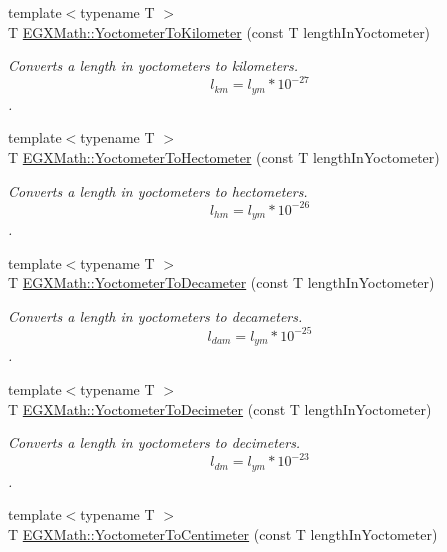 \begin{DoxyCompactItemize}
{\footnotesize template$<$typename T $>$ }\\T \mbox{\hyperlink{group___e_g_x_math-_conversions-_length_conversions-_yoctometer-_s_i_ga5736155a6aad5dc3b7b98706bda51484}{E\+G\+X\+Math\+::\+Yoctometer\+To\+Kilometer}} (const T length\+In\+Yoctometer)
\begin{DoxyCompactList}\small\item\em Converts a length in yoctometers to kilometers. \[ l_{km}=l_{ym} * 10^{-27} \]. \end{DoxyCompactList}\item 
{\footnotesize template$<$typename T $>$ }\\T \mbox{\hyperlink{group___e_g_x_math-_conversions-_length_conversions-_yoctometer-_s_i_ga3f2a47723b097c9c2b38edf4ca14ff03}{E\+G\+X\+Math\+::\+Yoctometer\+To\+Hectometer}} (const T length\+In\+Yoctometer)
\begin{DoxyCompactList}\small\item\em Converts a length in yoctometers to hectometers. \[ l_{hm}=l_{ym} * 10^{-26} \]. \end{DoxyCompactList}\item 
{\footnotesize template$<$typename T $>$ }\\T \mbox{\hyperlink{group___e_g_x_math-_conversions-_length_conversions-_yoctometer-_s_i_ga63fd1a1af694ca9e3afdefb16cbeffd8}{E\+G\+X\+Math\+::\+Yoctometer\+To\+Decameter}} (const T length\+In\+Yoctometer)
\begin{DoxyCompactList}\small\item\em Converts a length in yoctometers to decameters. \[ l_{dam}=l_{ym} * 10^{-25} \]. \end{DoxyCompactList}\item 
{\footnotesize template$<$typename T $>$ }\\T \mbox{\hyperlink{group___e_g_x_math-_conversions-_length_conversions-_yoctometer-_s_i_ga958e0eaa8ecc89db32a3f8189136360c}{E\+G\+X\+Math\+::\+Yoctometer\+To\+Decimeter}} (const T length\+In\+Yoctometer)
\begin{DoxyCompactList}\small\item\em Converts a length in yoctometers to decimeters. \[ l_{dm}=l_{ym} * 10^{-23} \]. \end{DoxyCompactList}\item 
{\footnotesize template$<$typename T $>$ }\\T \mbox{\hyperlink{group___e_g_x_math-_conversions-_length_conversions-_yoctometer-_s_i_ga38e9c49d57f1e2af4ff3a8cdb460fe7c}{E\+G\+X\+Math\+::\+Yoctometer\+To\+Centimeter}} (const T length\+In\+Yoctometer)

\end{DoxyCompactItemize}
